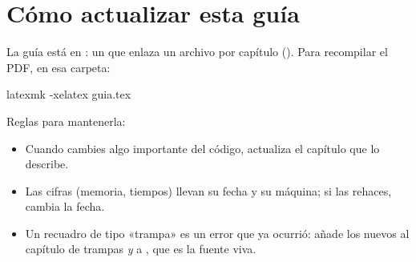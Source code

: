 \section{Cómo actualizar esta guía}

La guía está en : un  que enlaza un archivo por
capítulo (). Para recompilar el PDF, en esa carpeta:

\begin{terminal}
latexmk -xelatex guia.tex
\end{terminal}

Reglas para mantenerla:

\begin{itemize}
  \item Cuando cambies algo importante del código, actualiza el capítulo que lo describe.
  \item Las cifras (memoria, tiempos) llevan su fecha y su máquina; si las rehaces, cambia la
  fecha.
  \item Un recuadro de tipo «trampa» es un error que ya ocurrió: añade los nuevos al capítulo
  de trampas \emph{y} a , que es la fuente viva.
\end{itemize}
